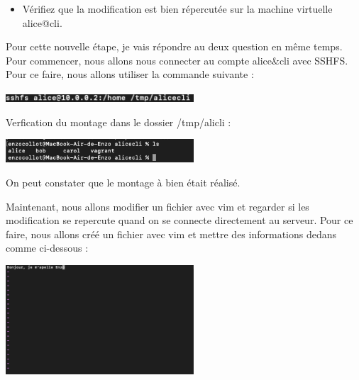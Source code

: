 \documentclass[12pt]{article}
\begin{document}
\vspace{0.3cm}

\begin{itemize}
    \item Vérifiez que la modification est bien répercutée sur la machine virtuelle alice@cli.
\end{itemize}

\vspace{0.3cm}

Pour cette nouvelle étape, je vais répondre au deux question en même temps. Pour commencer, nous allons nous connecter au compte alice&cli avec SSHFS. Pour ce faire, nous allons utiliser la commande suivante : 

\vspace{0.3cm}

\begin{center}
  \includegraphics[width=7cm]{Image-TD-SSH-4/sshfs.png}
\end{center}

\vspace{0.3cm}

Verfication du montage dans le dossier /tmp/alicli : 

\vspace{0.3cm}

\begin{center}
  \includegraphics[width=7cm]{Image-TD-SSH-4/montage-sshfs.png}
\end{center}

\vspace{0.3cm}

On peut constater que le montage à bien était réalisé. 

\vspace{0.3cm}

Maintenant, nous allons modifier un fichier avec vim et regarder si les modification se repercute quand on se connecte directement au serveur. Pour ce faire, nous allons créé un fichier avec vim et mettre des informations dedans comme ci-dessous  : 

\vspace{0.3cm}

\begin{center}
  \includegraphics[width=7cm]{Image-TD-SSH-4/Modification-fichier-vim.png}
\end{center}
\end{document}
